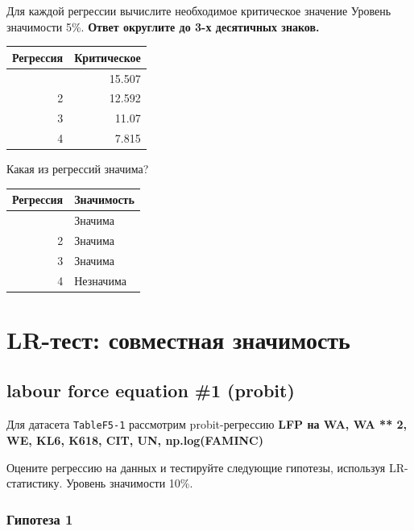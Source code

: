 \documentclass[
  russian,
]{article}
\newcounter{none} %
\begin{document}
Для каждой регрессии вычислите необходимое критическое значение {Уровень
значимости 5\%}. \textbf{Ответ округлите до 3-х десятичных знаков.}

{\def\LTcaptype{none} %
\begin{longtable}[]{@{}rr@{}}
\toprule\noalign{}
Регрессия & Критическое \\
\midrule\noalign{}
\endhead
\bottomrule\noalign{}
\endlastfoot
1 & 15.507 \\
2 & 12.592 \\
3 & 11.07 \\
4 & 7.815 \\
\end{longtable}
}

Какая из регрессий значима?

{\def\LTcaptype{none} %
\begin{longtable}[]{@{}rl@{}}
\toprule\noalign{}
Регрессия & Значимость \\
\midrule\noalign{}
\endhead
\bottomrule\noalign{}
\endlastfoot
1 & Значима \\
2 & Значима \\
3 & Значима \\
4 & Незначима \\
\end{longtable}
}

\section{LR-тест: совместная
значимость}\label{lr-ux442ux435ux441ux442-ux441ux43eux432ux43cux435ux441ux442ux43dux430ux44f-ux437ux43dux430ux447ux438ux43cux43eux441ux442ux44c}

\subsection{labour force equation \#1
(probit)}\label{labour-force-equation-1-probit-3}

Для датасета \texttt{TableF5-1} рассмотрим probit-регрессию \textbf{LFP
на WA, WA ** 2, WE, KL6, K618, CIT, UN, np.log(FAMINC)}

Оцените регрессию на данных и тестируйте следующие гипотезы, используя
LR-статистику. {Уровень значимости 10\%}.

\subsubsection{Гипотеза
1}\label{ux433ux438ux43fux43eux442ux435ux437ux430-1}
\end{document}
